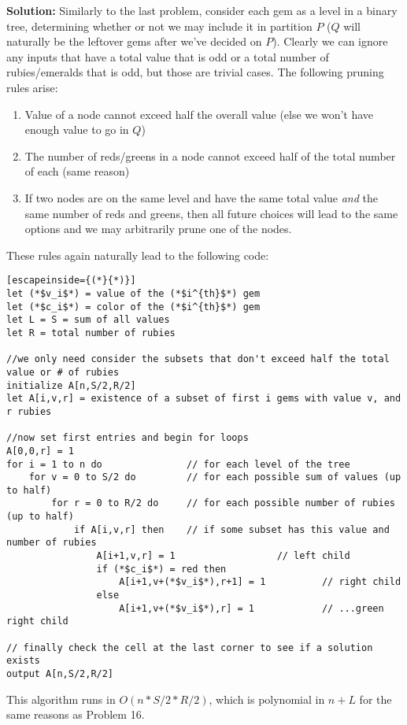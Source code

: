 \documentclass{article}
\providecommand{\soln}{\textbf{Solution: }}
\begin{document}
\soln Similarly to the last problem, consider each gem as a level in a binary tree, determining whether or not we may include it in partition $P$ ($Q$ will naturally be the leftover gems after we've decided on $P$). Clearly we can ignore any inputs that have a total value that is odd or a total number of rubies/emeralds that is odd, but those are trivial cases. The following pruning rules arise:\par
\begin{enumerate}
    \item Value of a node cannot exceed half the overall value (else we won't have enough value to go in $Q$)
    \item The number of reds/greens in a node cannot exceed half of the total number of each (same reason)
    \item If two nodes are on the same level and have the same total value \emph{and} the same number of reds and greens, then all future choices will lead to the same options and we may arbitrarily prune one of the nodes.
\end{enumerate}
These rules again naturally lead to the following code:\par
\begin{lstlisting}[escapeinside={(*}{*)}]
let (*$v_i$*) = value of the (*$i^{th}$*) gem
let (*$c_i$*) = color of the (*$i^{th}$*) gem
let L = S = sum of all values
let R = total number of rubies

//we only need consider the subsets that don't exceed half the total value or # of rubies
initialize A[n,S/2,R/2]
let A[i,v,r] = existence of a subset of first i gems with value v, and r rubies

//now set first entries and begin for loops
A[0,0,r] = 1
for i = 1 to n do               // for each level of the tree
    for v = 0 to S/2 do         // for each possible sum of values (up to half)
        for r = 0 to R/2 do     // for each possible number of rubies (up to half)
            if A[i,v,r] then    // if some subset has this value and number of rubies
                A[i+1,v,r] = 1                  // left child
                if (*$c_i$*) = red then
                    A[i+1,v+(*$v_i$*),r+1] = 1          // right child
                else
                    A[i+1,v+(*$v_i$*),r] = 1            // ...green right child

// finally check the cell at the last corner to see if a solution exists
output A[n,S/2,R/2]
\end{lstlisting}
This algorithm runs in $O\left(n*S/2*R/2\right)$, which is polynomial in $n+L$ for the same reasons as Problem 16.
\end{document}

